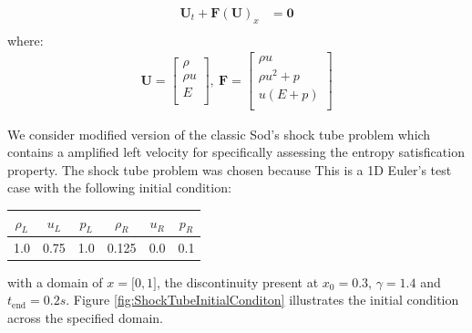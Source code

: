 \documentclass[a4paper]{article}
\numberwithin{equation}{section}
\begin{document}
\begin{equation}
    \begin{split}
        \mathbf{U}_t + \mathbf{F}(\mathbf{U})_x &= \mathbf{0}\\
    \end{split}
\end{equation}
where:
\begin{equation}
    \begin{split}
        \mathbf{U} = 
        \begin{bmatrix}
            \rho\\
            \rho u\\
            E\\
        \end{bmatrix}, \
        \mathbf{F} = 
        \begin{bmatrix}
            \rho u\\
            \rho u^2 + p\\
            u(E + p)\\
        \end{bmatrix}
    \end{split}
\end{equation}

We consider modified version of the classic Sod's shock tube problem which contains a amplified left velocity for specifically assessing the entropy satisfication property. The shock tube problem was chosen because  This is a 1D Euler's test case with the following initial condition:
\begin{center}
    \begin{tabular}{||c c c|c c c||} 
     \hline
     $\rho_L$ & $u_L$ & $p_L$ & $\rho_R$ & $u_R$ & $p_R$ \\
     \hline
     1.0 & 0.75 & 1.0 & 0.125 & 0.0 & 0.1 \\ 
     \hline
    \end{tabular}
\end{center}
with a domain of $x = \big[0,1\big]$, the discontinuity present at $x_0 = 0.3$,  $\gamma = 1.4$ and $t_{\text{end}} = 0.2s$. Figure \ref{fig:ShockTubeInitialConditon} illustrates the initial condition across the specified domain.
\end{document}
